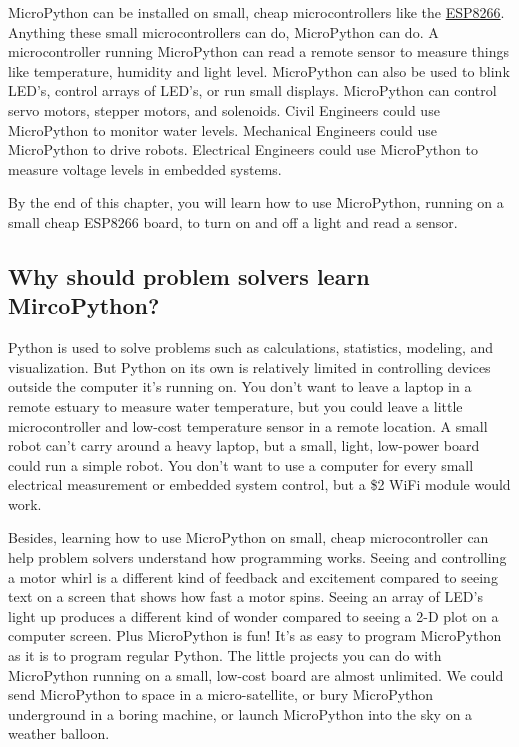 \documentclass{book}
\begin{document}
    
        MicroPython can be installed on small, cheap microcontrollers like the
\href{https://learn.adafruit.com/adafruit-feather-huzzah-esp8266}{ESP8266}.
Anything these small microcontrollers can do, MicroPython can do. A
microcontroller running MicroPython can read a remote sensor to measure
things like temperature, humidity and light level. MicroPython can also
be used to blink LED's, control arrays of LED's, or run small displays.
MicroPython can control servo motors, stepper motors, and solenoids.
Civil Engineers could use MicroPython to monitor water levels.
Mechanical Engineers could use MicroPython to drive robots. Electrical
Engineers could use MicroPython to measure voltage levels in embedded
systems.

By the end of this chapter, you will learn how to use MicroPython,
running on a small cheap ESP8266 board, to turn on and off a light and
read a sensor.
    




    
        \hypertarget{why-should-problem-solvers-learn-mircopython}{%
\subsection{Why should problem solvers learn
MircoPython?}\label{why-should-problem-solvers-learn-mircopython}}
    




    
        Python is used to solve problems such as calculations, statistics,
modeling, and visualization. But Python on its own is relatively limited
in controlling devices outside the computer it's running on. You don't
want to leave a laptop in a remote estuary to measure water temperature,
but you could leave a little microcontroller and low-cost temperature
sensor in a remote location. A small robot can't carry around a heavy
laptop, but a small, light, low-power board could run a simple robot.
You don't want to use a computer for every small electrical measurement
or embedded system control, but a \$2 WiFi module would work.

Besides, learning how to use MicroPython on small, cheap microcontroller
can help problem solvers understand how programming works. Seeing and
controlling a motor whirl is a different kind of feedback and excitement
compared to seeing text on a screen that shows how fast a motor spins.
Seeing an array of LED's light up produces a different kind of wonder
compared to seeing a 2-D plot on a computer screen. Plus MicroPython is
fun! It's as easy to program MicroPython as it is to program regular
Python. The little projects you can do with MicroPython running on a
small, low-cost board are almost unlimited. We could send MicroPython to
space in a micro-satellite, or bury MicroPython underground in a boring
machine, or launch MicroPython into the sky on a weather balloon.
    
\end{document}
